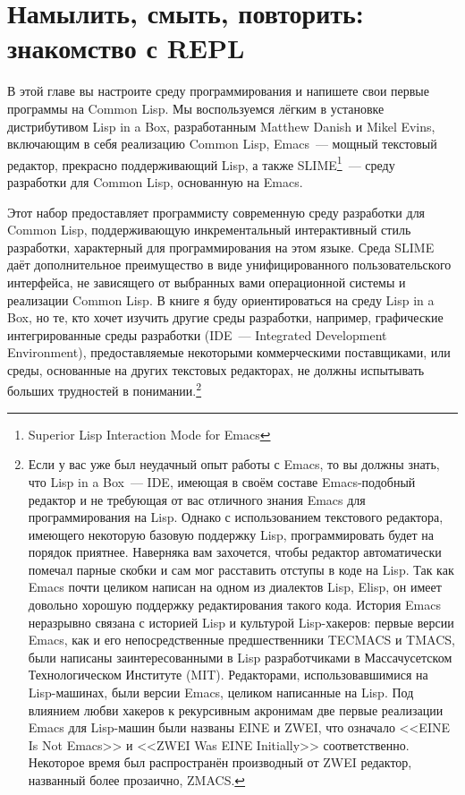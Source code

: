 \chapter{Намылить, смыть, повторить: знакомство с REPL}
\label{ch:02}

В этой главе вы настроите среду программирования и напишете свои первые программы на
Common Lisp. Мы воспользуемся лёгким в установке дистрибутивом Lisp in a Box,
разработанным Matthew Danish и Mikel Evins, включающим в себя реализацию
Common Lisp, Emacs~--- мощный текстовый редактор, прекрасно поддерживающий Lisp, а
также SLIME\footnote{Superior Lisp Interaction Mode for Emacs}~--- среду
разработки для Common Lisp, основанную на Emacs.

Этот набор предоставляет программисту современную среду разработки для Common Lisp,
поддерживающую инкрементальный интерактивный стиль разработки, характерный для
программирования на этом языке. Среда SLIME даёт дополнительное преимущество в виде
унифицированного пользовательского интерфейса, не зависящего от выбранных вами
операционной системы и реализации Common Lisp. В книге я буду ориентироваться на
среду Lisp in a Box, но те, кто хочет изучить другие среды разработки, например,
графические интегрированные среды разработки (IDE~--- Integrated Development Environment),
предоставляемые некоторыми коммерческими поставщиками, или среды, основанные на других
текстовых редакторах, не должны испытывать больших трудностей в понимании.\footnote{Если у
  вас уже был неудачный опыт работы с Emacs, то вы должны знать, что Lisp in a Box~---
  IDE, имеющая в своём составе Emacs-подобный редактор и не требующая от вас отличного
  знания Emacs для программирования на Lisp. Однако с использованием текстового редактора,
  имеющего некоторую базовую поддержку Lisp, программировать будет на порядок
  приятнее. Наверняка вам захочется, чтобы редактор автоматически помечал парные скобки и
  сам мог расставить отступы в коде на Lisp. Так как Emacs почти целиком написан на одном
  из диалектов Lisp, Elisp, он имеет довольно хорошую поддержку редактирования такого
  кода. История Emacs неразрывно связана с историей Lisp и культурой Lisp-хакеров: первые
  версии Emacs, как и его непосредственные предшественники TECMACS и
  TMACS, были написаны заинтересованными в Lisp разработчиками в Массачусетском
  Технологическом Институте (MIT). Редакторами, использовавшимися на Lisp-машинах, были
  версии Emacs, целиком написанные на Lisp. Под влиянием любви хакеров к рекурсивным
  акронимам две первые реализации Emacs для Lisp-машин были названы EINE и
  ZWEI, что означало <<EINE Is Not Emacs>> и <<ZWEI Was EINE Initially>>
  соответственно. Некоторое время был распространён производный от ZWEI редактор,
  названный более прозаично, ZMACS.}

